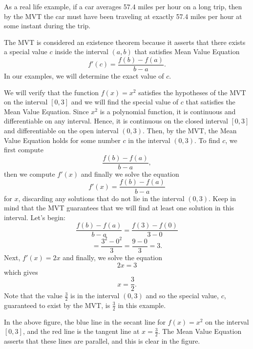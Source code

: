 \documentclass{ximera}
\begin{document}
As a real life example, if a car averages 57.4 miles per hour on a long trip, then by the MVT the car must have been 
traveling at exactly 57.4 miles per hour at some instant during the trip.

The MVT is considered an existence theorem because it asserts that there exists a special value $c$ inside the interval $(a,b)$
that satisfies Mean Value Equation 
\[f'(c) = \frac{f(b) - f(a)}{b-a}.\]
In our examples, we will determine the exact value of $c$. 

\begin{example}[example 1]
We will verify that the function $f(x) = x^2$ satisfies the hypotheses of the MVT
on the interval $[0,3]$ and we will find the special value of $c$ that satisfies the Mean Value Equation.
Since $x^2$ is a polynomial function, it is continuous and differentiable on any interval. 
Hence, it is continuous on the closed interval $[0, 3]$ and differentiable on the open interval $(0, 3)$. 
Then, by the MVT,  the Mean Value Equation holds for some number 
$c$ in the interval $(0, 3)$. To find $c$, we first compute
\[\frac{f(b) - f(a)}{b-a},\]
then we compute $f'(x)$
and finally we solve the equation
\[f'(x) = \frac{f(b) - f(a)}{b-a}\]
for $x$, discarding any solutions that do not lie in the interval $(0, 3)$.  
Keep in mind that the MVT guarantees that we will find at least one solution in this interval.
Let's begin:
\[\frac{f(b) - f(a)}{b-a} = \frac{f(3) - f(0)}{3-0} \]
\[= \frac{3^2 - 0^2}{3}= \frac{9 - 0}{3} = 3.\]
Next, $f'(x) = 2x$
and finally, we solve the equation
\[2x = 3\]
which gives
\[x = \frac{3}{2}.\]
Note that the value $\frac32$ is in the interval $(0,3)$ and so the special value, $c$, guaranteed to exist by the MVT,
is $\frac32$ in this example.


\begin{image}
\end{image}

In the above figure, the blue line in the secant line for $f(x) = x^2$ on the interval $[0, 3]$, 
and the red line is the tangent line at $x = \frac32$. The Mean Value Equation asserts that these lines are parallel, and this
is clear in the figure.
\end{example}
\end{document}
